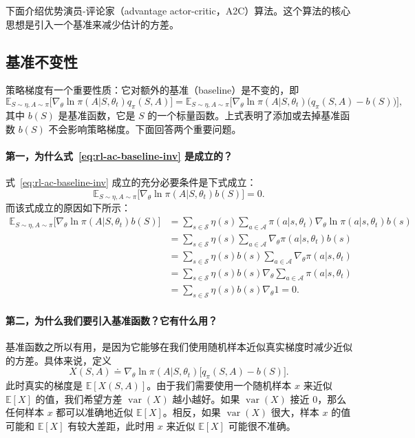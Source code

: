 下面介绍优势演员-评论家（advantage actor-critic，A2C）算法。这个算法的核心思想是引入一个基准来减少估计的方差。

\subsection{基准不变性}
\label{sec:rl-ac-baseline}

策略梯度有一个重要性质：它对额外的基准（baseline）是不变的，即
\begin{equation}
\mathbb{E}_{S \sim \eta, A \sim \pi} \Big[ \nabla_{\theta} \ln \pi(A | S, \theta_{t}) q_{\pi}(S, A) \Big]
= \mathbb{E}_{S \sim \eta, A \sim \pi} \Big[ \nabla_{\theta} \ln \pi(A | S, \theta_{t}) \big( q_{\pi}(S, A) - b(S) \big) \Big],
\label{eq:rl-ac-baseline-inv}
\end{equation}
其中 $b(S)$ 是基准函数，它是 $S$ 的一个标量函数。上式表明了添加或去掉基准函数 $b(S)$ 不会影响策略梯度。下面回答两个重要问题。

\paragraph{第一，为什么式~\eqref{eq:rl-ac-baseline-inv} 是成立的？}
式~\eqref{eq:rl-ac-baseline-inv} 成立的充分必要条件是下式成立：
\[
\mathbb{E}_{S \sim \eta, A \sim \pi} \Big[ \nabla_{\theta} \ln \pi(A | S, \theta_{t}) b(S) \Big] = 0.
\]
而该式成立的原因如下所示：
\[
\begin{aligned}
\mathbb{E}_{S \sim \eta, A \sim \pi} \Big[ \nabla_{\theta} \ln \pi(A | S, \theta_{t}) b(S) \Big]
&= \sum_{s \in \mathcal{S}} \eta(s) \sum_{a \in \mathcal{A}} \pi(a | s, \theta_{t}) \nabla_{\theta} \ln \pi(a | s, \theta_{t}) b(s) \\
&= \sum_{s \in \mathcal{S}} \eta(s) \sum_{a \in \mathcal{A}} \nabla_{\theta} \pi(a | s, \theta_{t}) b(s) \\
&= \sum_{s \in \mathcal{S}} \eta(s) b(s) \sum_{a \in \mathcal{A}} \nabla_{\theta} \pi(a | s, \theta_{t}) \\
&= \sum_{s \in \mathcal{S}} \eta(s) b(s) \nabla_{\theta} \sum_{a \in \mathcal{A}} \pi(a | s, \theta_{t}) \\
&= \sum_{s \in \mathcal{S}} \eta(s) b(s) \nabla_{\theta} 1 = 0.
\end{aligned}
\]

\paragraph{第二，为什么我们要引入基准函数？它有什么用？}
基准函数之所以有用，是因为它能够在我们使用随机样本近似真实梯度时减少近似的方差。具体来说，定义
\begin{equation}
X(S, A) \doteq \nabla_{\theta} \ln \pi(A | S, \theta_{t}) \big[ q_{\pi}(S, A) - b(S) \big].
\label{eq:rl-ac-X}
\end{equation}
此时真实的梯度是 $\mathbb{E}[X(S, A)]$。由于我们需要使用一个随机样本 $x$ 来近似 $\mathbb{E}[X]$ 的值，我们希望方差 $\operatorname{var}(X)$ 越小越好。如果 $\operatorname{var}(X)$ 接近 0，那么任何样本 $x$ 都可以准确地近似 $\mathbb{E}[X]$。相反，如果 $\operatorname{var}(X)$ 很大，样本 $x$ 的值可能和 $\mathbb{E}[X]$ 有较大差距，此时用 $x$ 来近似 $\mathbb{E}[X]$ 可能很不准确。

